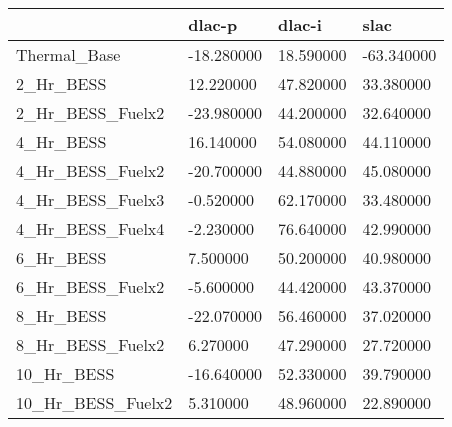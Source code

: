\begin{tabular}{llll}
\toprule
 & dlac-p & dlac-i & slac \\
\midrule
Thermal_Base & -18.280000 & 18.590000 & -63.340000 \\
2_Hr_BESS & 12.220000 & 47.820000 & 33.380000 \\
2_Hr_BESS_Fuelx2 & -23.980000 & 44.200000 & 32.640000 \\
4_Hr_BESS & 16.140000 & 54.080000 & 44.110000 \\
4_Hr_BESS_Fuelx2 & -20.700000 & 44.880000 & 45.080000 \\
4_Hr_BESS_Fuelx3 & -0.520000 & 62.170000 & 33.480000 \\
4_Hr_BESS_Fuelx4 & -2.230000 & 76.640000 & 42.990000 \\
6_Hr_BESS & 7.500000 & 50.200000 & 40.980000 \\
6_Hr_BESS_Fuelx2 & -5.600000 & 44.420000 & 43.370000 \\
8_Hr_BESS & -22.070000 & 56.460000 & 37.020000 \\
8_Hr_BESS_Fuelx2 & 6.270000 & 47.290000 & 27.720000 \\
10_Hr_BESS & -16.640000 & 52.330000 & 39.790000 \\
10_Hr_BESS_Fuelx2 & 5.310000 & 48.960000 & 22.890000 \\
\bottomrule
\end{tabular}

